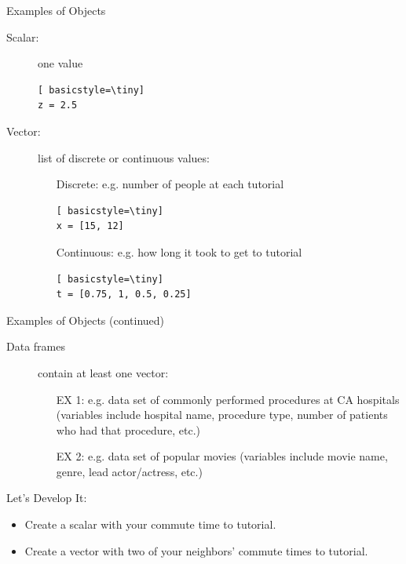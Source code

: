 \begin{frame}
	\begin{block}{Examples of Objects}
		\begin{description}
			\item[]
			\item[Scalar:] one value
			\begin{lstlisting}[ basicstyle=\tiny]
z = 2.5
			\end{lstlisting}				
			\item[Vector:] list of discrete or continuous values:
				\begin{itemize} 
					\item[Discrete:] e.g. number of people at each tutorial
			\begin{lstlisting}[ basicstyle=\tiny]
x = [15, 12]
			\end{lstlisting}						
					\item[Continuous:] e.g. how long it took to get to tutorial
			\begin{lstlisting}[ basicstyle=\tiny]
t = [0.75, 1, 0.5, 0.25]
			\end{lstlisting}					
				\end{itemize}
		\end{description}
	\end{block}
\newpage		
	\begin{block}{Examples of Objects (continued)}
		\begin{description}
			\item[Data frames] contain at least one vector:
				\begin{itemize} 
					\item[EX 1:] e.g. data set of commonly performed procedures at CA hospitals (variables include hospital name, procedure type, number of patients who had that procedure, etc.)
					\item[EX 2:] e.g. data set of popular movies (variables include movie name, genre, lead actor/actress, etc.)
				\end{itemize}
		\end{description}
	\end{block}
\end{frame}

\begin{frame}[fragile]
	\begin{alertblock}{Let's Develop It:}
		\begin{itemize}
			\item Create a scalar with your commute time to tutorial.
			\item Create a vector with two of your neighbors' commute times to tutorial.
		\end{itemize}
	\end{alertblock}
\end{frame}

